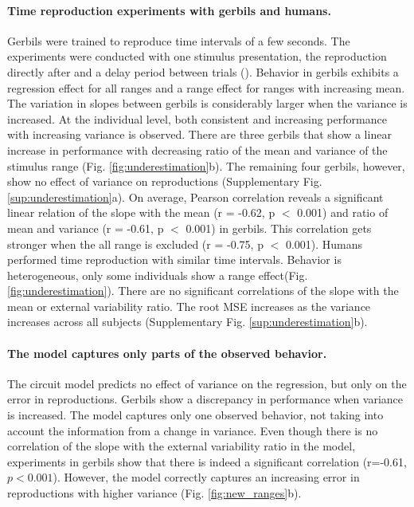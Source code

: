\documentclass[10pt, a4paper]{article}
\begin{document}
\paragraph{Time reproduction experiments with gerbils and humans.}
Gerbils were trained to reproduce time intervals of a few seconds. The experiments were conducted with one stimulus presentation, the reproduction directly after and a delay period between trials (\cite{Henke2022}). 
Behavior in gerbils exhibits a regression effect for all ranges and a range effect for ranges with increasing mean. 
The variation in slopes between gerbils is considerably larger when the variance is increased.
At the individual level, both consistent and increasing performance with increasing variance is observed. 
There are three gerbils that show a linear increase in performance with decreasing ratio of the mean and variance of the stimulus range (Fig. \ref{fig:underestimation}b).
The remaining four gerbils, however, show no effect of variance on reproductions (Supplementary Fig. \ref{sup:underestimation}a).
On average, Pearson correlation reveals a significant linear relation of the slope with the mean (r = -0.62, p $<$ 0.001) and ratio of mean and variance (r = -0.61, p $<$ 0.001) in gerbils.
This correlation gets stronger when the all range is excluded (r = -0.75, p $<$ 0.001).
Humans performed time reproduction with similar time intervals. 
Behavior is heterogeneous, only some individuals show a range effect(Fig. \ref{fig:underestimation}). There are no significant correlations of the slope with the mean or external variability ratio.
The root MSE increases as the variance increases across all subjects (Supplementary Fig. \ref{sup:underestimation}b).

\paragraph{The model captures only parts of the observed behavior.}
The circuit model predicts no effect of variance on the regression, but only on the error in reproductions. 
Gerbils show a discrepancy in performance when variance is increased. 
The model captures only one observed behavior, not taking into account the information from a change in variance. 
Even though there is no correlation of the slope with the external variability ratio in the model, experiments in gerbils show that there is indeed a significant correlation (r=-0.61, $p<0.001$).
However, the model correctly captures an increasing error in reproductions with higher variance (Fig. \ref{fig:new_ranges}b).
\end{document}
